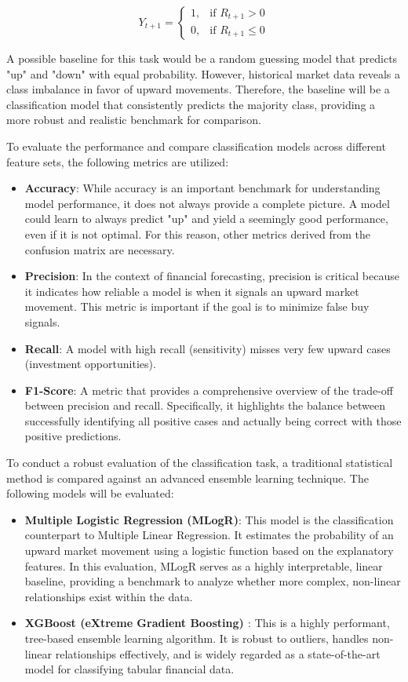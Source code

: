 \documentclass[Master,english,IEEE]{twbook}
\begin{document}
$$Y_{t+1} = \begin{cases} 1, & \text{if } R_{t+1} > 0 \\ 0, & \text{if } R_{t+1} \leq 0 \end{cases}$$

A possible baseline for this task would be a random guessing model that predicts "up" and "down" with equal probability. However, historical market data reveals a class imbalance in favor of upward movements. Therefore, the baseline will be a classification model that consistently predicts the majority class, providing a more robust and realistic benchmark for comparison.

To evaluate the performance and compare classification models across different feature sets, the following metrics are utilized:
\begin{itemize}
    \item \textbf{Accuracy}: While accuracy is an important benchmark for understanding model performance, it does not always provide a complete picture. A model could learn to always predict "up" and yield a seemingly good performance, even if it is not optimal. For this reason, other metrics derived from the confusion matrix are necessary.
    \item \textbf{Precision}: In the context of financial forecasting, precision is critical because it indicates how reliable a model is when it signals an upward market movement. This metric is important if the goal is to minimize false buy signals.
    \item \textbf{Recall}: A model with high recall (sensitivity) misses very few upward cases (investment opportunities).
    \item \textbf{F1-Score}: A metric that provides a comprehensive overview of the trade-off between precision and recall. Specifically, it highlights the balance between successfully identifying all positive cases and actually being correct with those positive predictions.
\end{itemize}

To conduct a robust evaluation of the classification task, a traditional statistical method is compared against an advanced ensemble learning technique. The following models will be evaluated:

\begin{itemize}
    \item \textbf{Multiple Logistic Regression (MLogR)}: This model is the classification counterpart to Multiple Linear Regression. It estimates the probability of an upward market movement using a logistic function based on the explanatory features. In this evaluation, MLogR serves as a highly interpretable, linear baseline, providing a benchmark to analyze whether more complex, non-linear relationships exist within the data.
    \item \textbf{XGBoost (eXtreme Gradient Boosting) \cite{XGBoost_paper}}: This is a highly performant, tree-based ensemble learning algorithm. It is robust to outliers, handles non-linear relationships effectively, and is widely regarded as a state-of-the-art model for classifying tabular financial data.
\end{itemize}
\end{document}
